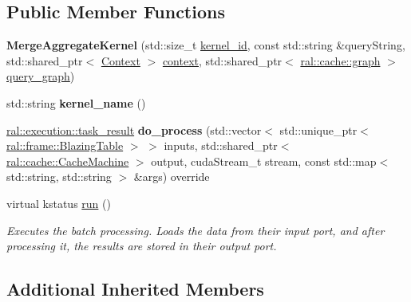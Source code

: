 \subsection*{Public Member Functions}
\begin{DoxyCompactItemize}
\item 
\mbox{\label{classral_1_1batch_1_1MergeAggregateKernel_ae3571021cef498125a11acf4289aca29}} 
{\bfseries Merge\+Aggregate\+Kernel} (std\+::size\+\_\+t \hyperlink{classral_1_1cache_1_1kernel_a2fd708656cb056a41ec635b8bdc4acfe}{kernel\+\_\+id}, const std\+::string \&query\+String, std\+::shared\+\_\+ptr$<$ \hyperlink{classblazingdb_1_1manager_1_1Context}{Context} $>$ \hyperlink{classral_1_1cache_1_1kernel_af0347d14d678cfa7205c1387746a2e1b}{context}, std\+::shared\+\_\+ptr$<$ \hyperlink{classral_1_1cache_1_1graph}{ral\+::cache\+::graph} $>$ \hyperlink{classral_1_1cache_1_1kernel_a5fbb02292aff165a28ef25e75f0d89bd}{query\+\_\+graph})
\item 
\mbox{\label{classral_1_1batch_1_1MergeAggregateKernel_a1a16defc6f19b70c72409c6eb7b039f2}} 
std\+::string {\bfseries kernel\+\_\+name} ()
\item 
\mbox{\label{classral_1_1batch_1_1MergeAggregateKernel_a0a2e3be0baf71fc661e150495f989d73}} 
\hyperlink{structral_1_1execution_1_1task__result}{ral\+::execution\+::task\+\_\+result} {\bfseries do\+\_\+process} (std\+::vector$<$ std\+::unique\+\_\+ptr$<$ \hyperlink{classral_1_1frame_1_1BlazingTable}{ral\+::frame\+::\+Blazing\+Table} $>$ $>$ inputs, std\+::shared\+\_\+ptr$<$ \hyperlink{classral_1_1cache_1_1CacheMachine}{ral\+::cache\+::\+Cache\+Machine} $>$ output, cuda\+Stream\+\_\+t stream, const std\+::map$<$ std\+::string, std\+::string $>$ \&args) override
\item 
virtual kstatus \hyperlink{classral_1_1batch_1_1MergeAggregateKernel_aaab8112819acc0c2f17fc0e518cfe266}{run} ()
\begin{DoxyCompactList}\small\item\em Executes the batch processing. Loads the data from their input port, and after processing it, the results are stored in their output port. \end{DoxyCompactList}\end{DoxyCompactItemize}
\subsection*{Additional Inherited Members}


